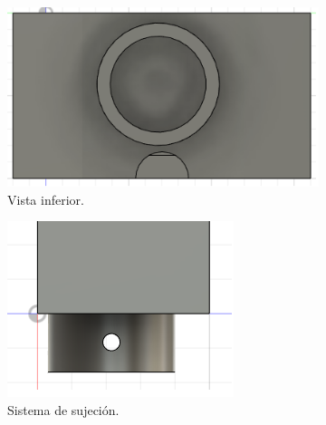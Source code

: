 \begin{figure}[bth]
    \centering
    \begin{subfigure}{.35\textwidth}
        \centering
        \includegraphics[width=\textwidth
        ]{imgs/vistas-contenedor/inferior.png}
        \caption{Vista inferior.}
        \label{fig:contenedor-inferior}
    \end{subfigure}
    \begin{subfigure}{.35\textwidth}
        \centering
        \includegraphics[width=\textwidth
        ]{imgs/vistas-contenedor/sujecion.png}
        \caption{Sistema de sujeción.}
        \label{fig:contenedor-sujecion}
    \end{subfigure}
    \hfill
    \begin{subfigure}{.35\textwidth}
        \centering

\end{subfigure}
\end{figure}

